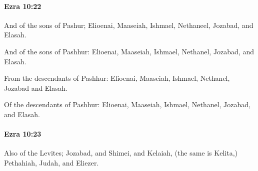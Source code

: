 		\paragraph{Ezra 10:22} %
			\label{EZRA-10-22}

			And of the sons of Pashur; Elioenai, Maaseiah, Ishmael, Nethaneel, Jozabad, and Elasah.

			\begin{versebox}
					\item[BHS] 
					\item[LXX] 
					\item[ASV] And of the sons of Pashhur: Elioenai, Maaseiah, Ishmael, Nethanel, Jozabad, and Elasah.
					\item[NIV] From the descendants of Pashhur: Elioenai, Maaseiah, Ishmael, Nethanel, Jozabad and Elasah.
					\item[NRSV] Of the descendants of Pashhur: Elioenai, Maaseiah, Ishmael, Nethanel, Jozabad, and Elasah.
			\end{versebox}

		\paragraph{Ezra 10:23} %
			\label{EZRA-10-23}

			Also of the Levites; Jozabad, and Shimei, and Kelaiah, (the same is Kelita,) Pethahiah, Judah, and Eliezer.

